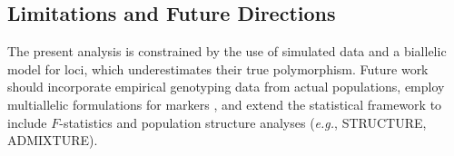 \subsection{Limitations and Future Directions}

The present analysis is constrained by the use of simulated data and
a biallelic model for \ssr{} loci, which underestimates their true
polymorphism. Future work should incorporate empirical genotyping data
from actual populations, employ multiallelic \pic{} formulations for
\ssr{} markers \autocite{Anderson1993}, and extend the statistical
framework to include $F$-statistics and population structure analyses
(\textit{e.g.}, STRUCTURE, ADMIXTURE).
